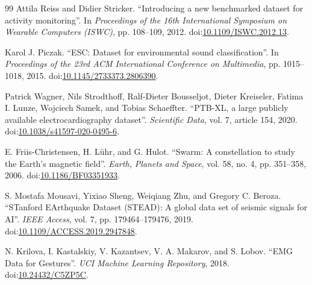 \documentclass[preprint,review,12pt]{elsarticle}
\begin{document}
{\begin{thebibliography}{99}
Attila Reiss and Didier Stricker. ``Introducing a new benchmarked dataset for activity monitoring''. In \textit{Proceedings of the 16th International Symposium on Wearable Computers (ISWC)}, pp. 108--109, 2012. doi:\url{10.1109/ISWC.2012.13}.

Karol J. Piczak. ``ESC: Dataset for environmental sound classification''. In \textit{Proceedings of the 23rd ACM International Conference on Multimedia}, pp. 1015--1018, 2015. doi:\url{10.1145/2733373.2806390}.

Patrick Wagner, Nils Strodthoff, Ralf-Dieter Bousseljot, Dieter Kreiseler, Fatima I. Lunze, Wojciech Samek, and Tobias Schaeffter. ``PTB-XL, a large publicly available electrocardiography dataset''. \textit{Scientific Data}, vol. 7, article 154, 2020. doi:\url{10.1038/s41597-020-0495-6}.

E. Friis-Christensen, H. Lühr, and G. Hulot. ``Swarm: A constellation to study the Earth's magnetic field''. \textit{Earth, Planets and Space}, vol. 58, no. 4, pp. 351--358, 2006. doi:\url{10.1186/BF03351933}.

S. Mostafa Mousavi, Yixiao Sheng, Weiqiang Zhu, and Gregory C. Beroza. ``STanford EArthquake Dataset (STEAD): A global data set of seismic signals for AI''. \textit{IEEE Access}, vol. 7, pp. 179464--179476, 2019. doi:\url{10.1109/ACCESS.2019.2947848}.

N. Krilova, I. Kastalskiy, V. Kazantsev, V. A. Makarov, and S. Lobov. ``EMG Data for Gestures''. \textit{UCI Machine Learning Repository}, 2018. doi:\url{10.24432/C5ZP5C}.
\end{thebibliography}
}
\end{document}
